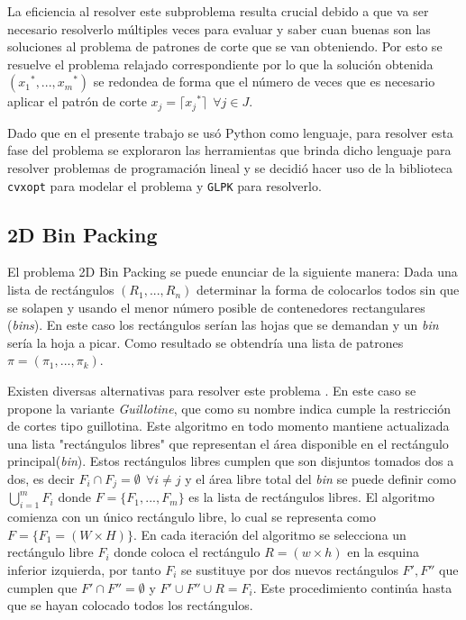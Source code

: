 \documentclass[a4paper,10pt,twocolumn]{article}
\begin{document}
La eficiencia al resolver este subproblema resulta crucial debido a que va ser necesario resolverlo múltiples veces para evaluar y saber cuan buenas son las soluciones al problema de patrones de corte que se van obteniendo. Por esto se resuelve el problema relajado correspondiente por lo que la solución obtenida $({x_1}^*,...,{x_m}^*)$ se redondea de forma que el número de veces que es necesario aplicar el patrón de corte $x_j = \lceil {x_j}^* \rceil \ \ \forall j \in J$.

Dado que en el presente trabajo se usó Python como lenguaje, para resolver esta fase del problema se exploraron las herramientas que brinda dicho lenguaje para resolver problemas de programación lineal y se decidió hacer uso de la biblioteca \texttt{cvxopt} para modelar el problema y \texttt{GLPK} para resolverlo.

\subsection{2D Bin Packing}
El problema 2D Bin Packing se puede enunciar de la siguiente manera: Dada una lista de rectángulos $(R_1,...,R_n)$ determinar la forma de colocarlos todos sin que se solapen y usando el menor número posible de contenedores rectangulares (\textit{bins}). En este caso los rectángulos serían las hojas que se demandan y un \textit{bin} sería la hoja a picar. Como resultado se obtendría una lista de patrones $\pi = (\pi_1,...,\pi_k)$.

Existen diversas alternativas para resolver este problema \cite{11}. En este caso se propone la variante \textit{Guillotine}, que como su nombre indica cumple la restricción de cortes tipo guillotina. Este algoritmo en todo momento mantiene actualizada una lista "rectángulos libres" que representan el área disponible en el rectángulo principal(\textit{bin}). Estos rectángulos libres cumplen que son disjuntos tomados dos a dos, es decir $F_i \cap F_j = \emptyset \ \ \forall i\neq j $ y el área libre total del \textit{bin} se puede definir como $\bigcup\limits_{i=1}^{m} F_{i}$ donde $F = \{F_1,...,F_m\}$ es la lista de rectángulos libres. El algoritmo comienza con un único rectángulo libre, lo cual se representa como $F = \{F_1 = (W \times H)\}$. En cada iteración del algoritmo se selecciona un rectángulo libre $F_i$ donde coloca el rectángulo $R = (w \times h)$ en la esquina inferior izquierda, por tanto $F_i$ se sustituye por dos nuevos rectángulos $F',F''$ que cumplen que $F' \cap F'' = \emptyset$ y $F' \cup F'' \cup R = F_i$. Este procedimiento continúa hasta que se hayan colocado todos los rectángulos.
\end{document}
